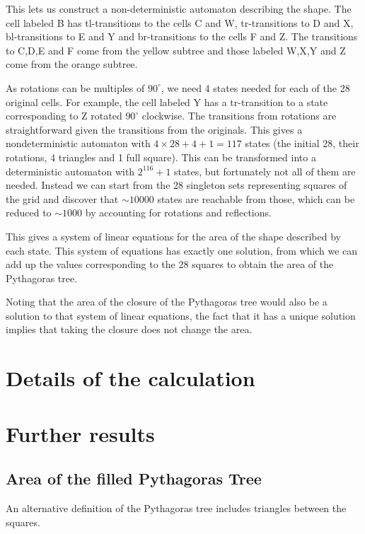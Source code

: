 \documentclass{article}
\newcommand{\bounding}{
\draw[tsty] (-2.5,1) -- (-1.5,0) -- (2.5,0) -- (3.5,1) -- (3.5,2.5) -- (2,4) -- (-1,4) -- (-2.5, 2.5) -- cycle;
}
\newcommand{\subt}[2]{
    \begin{scope}[yshift=1cm,rotate=45,scale=0.7071]
        #1
    \end{scope}
    \begin{scope}[xshift=0.5cm,yshift=1.5cm,rotate=-45,scale=0.7071]
        #2
    \end{scope}
}
\newcommand{\dup}[1]{\subt{#1}{#1}}
\newcommand{\gtree}[3]{
	#2
	\ifthenelse{#1<2}{
		#3
	}{
		\dup{\gtree{\the\numexpr#1-1}{#2}{#3}}
	}
}
\newcommand{\filledtree}[1]{
\gtree{#1}{
	\fill[tsty] (0,0) -- (1,0) -- (1,1) -- (0.5,1.5) -- (0,1) -- cycle;
}{\bounding}
}
\newcommand{\depth}{5}%
\begin{document}
This lets us construct a non-deterministic automaton describing the shape. The cell labeled B has tl-transitions to the cells C and W, tr-transitions to D and X, bl-transitions to E and Y and br-transitions to the cells F and Z. The transitions to C,D,E and F come from the yellow subtree and those labeled W,X,Y and Z come from the orange subtree.

As rotations can be multiples of $90^\circ$, we need 4 states needed for each of the 28 original cells. For example, the cell labeled Y has a tr-transition to a state corresponding to Z rotated $90^\circ$ clockwise.  The transitions from rotations are straightforward given the transitions from the originals. This gives a nondeterministic automaton with $4\times28+4+1 = 117$ states (the initial 28, their rotations, 4 triangles and 1 full square). This can be transformed into a deterministic automaton with $2^{116}+1$ states, but fortunately not all of them are needed. Instead we can start from the 28 singleton sets representing squares of the grid and discover that ${\sim}10000$ states are reachable from those, which can be reduced to ${\sim}1000$ by accounting for rotations and reflections.

This gives a system of linear equations for the area of the shape described by each state. This system of equations has exactly one solution, from which we can add up the values corresponding to the 28 squares to obtain the area of the Pythagoras tree.

Noting that the area of the closure of the Pythagoras tree would also be a solution to that system of linear equations, the fact that it has a unique solution implies that taking the closure does not change the area.

\section{Details of the calculation}


\section{Further results}
\subsection{Area of the filled Pythagoras Tree}
An alternative definition of the Pythagoras tree includes triangles between the squares.

\end{document}

